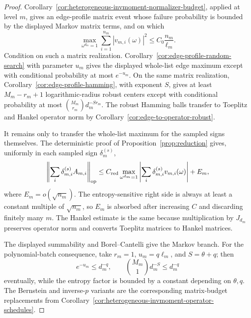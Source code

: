 \documentclass[11pt]{amsart}
\numberwithin{equation}{section}
\theoremstyle{definition}
\theoremstyle{remark}
\newcommand{\op}{\mathrm{op}}
\newcommand{\abs}[1]{\left\lvert #1\right\rvert}
\begin{document}
\begin{proof}
Corollary~\ref{cor:heterogeneous-invmoment-normalizer-budget}, applied at level
\(m\), gives an edge-profile matrix event whose failure probability is bounded
by the displayed Markov matrix terms, and on which
\[
  \max_{\omega^{d_m}=1}
  \sum_{i=1}^{n_m}
  \abs{v_{m,i}(\omega)}^2
  \le C_0\frac{n_m}{\ell_m}.
\]
Condition on such a matrix realization.  Corollary~\ref{cor:edge-profile-random-search}
with parameter \(u_m\) gives the displayed whole-list edge maximum except with
conditional probability at most \(e^{-u_m}\).  On the same matrix realization,
Corollary~\ref{cor:edge-profile-hamming}, with exponent \(S\), gives at least
\(M_m-r_m+1\) logarithmic-radius robust centers except with conditional
probability at most \(\binom{M_m}{r_m}d_m^{-S r_m}\).  The robust Hamming balls
transfer to Toeplitz and Hankel operator norm by
Corollary~\ref{cor:edge-to-operator-robust}.

It remains only to transfer the whole-list maximum for the sampled signs
themselves.  The deterministic proof of Proposition~\ref{prop:reduction} gives,
uniformly in each sampled sign \(\delta_m^{(s)}\),
\[
  \left\|\sum_i\delta_{m,i}^{(s)}A_{m,i}\right\|_{\op}
  \le
  C_{\rm red}
  \max_{\omega^{d_m}=1}
  \left|\sum_i\delta_{m,i}^{(s)}v_{m,i}(\omega)\right|
  +E_m,
\]
where \(E_m=o(\sqrt{n_m})\).  The entropy-sensitive right side is always at
least a constant multiple of \(\sqrt{n_m}\), so \(E_m\) is absorbed after
increasing \(C\) and discarding finitely many \(m\).  The Hankel estimate is the
same because multiplication by \(J_{d_m}\) preserves operator norm and converts
Toeplitz matrices to Hankel matrices.

The displayed summability and Borel--Cantelli give the Markov branch.  For the
polynomial-batch consequence, take \(r_m=1\), \(u_m=q\ell_m\), and
\(S=\theta+q\); then
\[
  e^{-u_m}\le d_m^{-q},
  \qquad
  \binom{M_m}{1}d_m^{-S}\le d_m^{-q}
\]
eventually, while the entropy factor is bounded by a constant depending on
\(\theta,q\).  The Bernstein and inverse-\(p\) variants are the corresponding
matrix-budget replacements from
Corollary~\ref{cor:heterogeneous-invmoment-operator-schedules}.
\end{proof}
\end{document}
